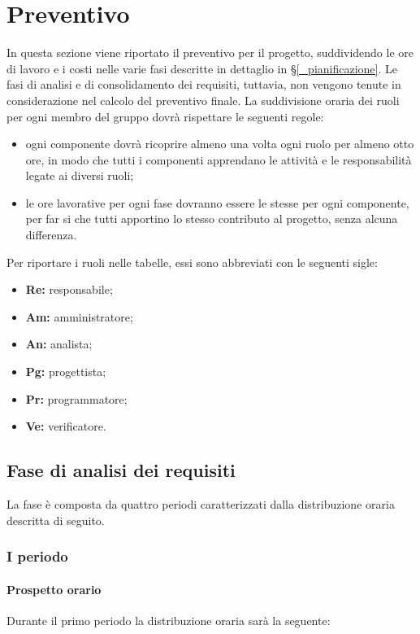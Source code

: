 \section{Preventivo} \label{_preventivo}
In questa sezione viene riportato il preventivo per il progetto, suddividendo le ore di lavoro e i costi nelle varie fasi descritte in dettaglio in \S\ref{_pianificazione}.
Le fasi di analisi e di consolidamento dei requisiti, tuttavia, non vengono tenute in considerazione nel calcolo del preventivo finale.
La suddivisione oraria dei ruoli per ogni membro del gruppo dovrà rispettare le seguenti regole:
		\begin{itemize}
		\item ogni componente dovrà ricoprire almeno una volta ogni ruolo per almeno otto ore, in modo che tutti i componenti apprendano le attività e le responsabilità legate ai diversi ruoli;
		\item le ore lavorative per ogni fase dovranno essere le stesse per ogni componente, per far si che tutti apportino lo stesso contributo al progetto, senza alcuna differenza.
	\end{itemize}
	 Per riportare i ruoli nelle tabelle, essi sono abbreviati con le seguenti sigle:
			\begin{itemize}
			\item\textbf{Re:} responsabile;
			\item\textbf{Am:} amministratore;
			\item\textbf{An:} analista;
			\item\textbf{Pg:} progettista;
			\item\textbf{Pr:} programmatore;
			\item\textbf{Ve:} verificatore.
		\end{itemize}
	
	\subsection{Fase di analisi dei requisiti}
	La fase è composta da quattro periodi caratterizzati dalla distribuzione oraria descritta di seguito.

	\subsubsection{I periodo}
	\paragraph{Prospetto orario}
			Durante il primo periodo la distribuzione oraria sarà la seguente:
			
